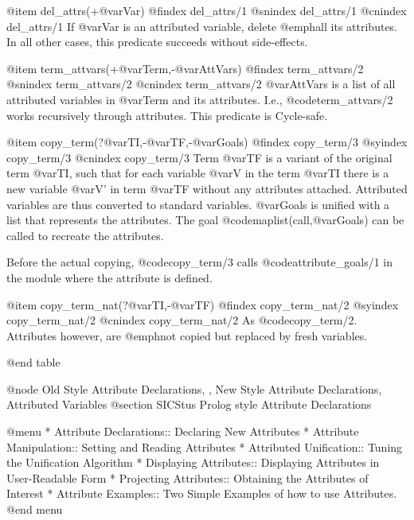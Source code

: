 @item del_attrs(+@var{Var})
@findex del_attrs/1
@snindex del_attrs/1
@cnindex del_attrs/1
If @var{Var} is an attributed variable, delete @emph{all} its
attributes.  In all other cases, this predicate succeeds without
side-effects.

@item term_attvars(+@var{Term},-@var{AttVars})
@findex term_attvars/2
@snindex term_attvars/2
@cnindex term_attvars/2
@var{AttVars} is a list of all attributed variables in @var{Term} and
its attributes. I.e., @code{term_attvars/2} works recursively through
attributes.  This predicate is Cycle-safe.

@item copy_term(?@var{TI},-@var{TF},-@var{Goals}) 
@findex copy_term/3
@syindex copy_term/3
@cnindex copy_term/3
Term @var{TF} is a variant of the original term @var{TI}, such that for
each variable @var{V} in the term @var{TI} there is a new variable @var{V'}
in term @var{TF} without any attributes attached.  Attributed
variables are thus converted to standard variables.  @var{Goals} is
unified with a list that represents the attributes.  The goal
@code{maplist(call,@var{Goals})} can be called to recreate the
attributes.

Before the actual copying, @code{copy_term/3} calls
@code{attribute_goals/1} in the module where the attribute is
defined.

@item copy_term_nat(?@var{TI},-@var{TF}) 
@findex copy_term_nat/2
@syindex copy_term_nat/2
@cnindex copy_term_nat/2
As @code{copy_term/2}.  Attributes however, are @emph{not} copied but replaced
by fresh variables.

@end table

@node Old Style Attribute Declarations, , New Style Attribute Declarations, Attributed Variables
@section SICStus Prolog style Attribute Declarations

@menu
* Attribute Declarations:: Declaring New Attributes
* Attribute Manipulation:: Setting and Reading Attributes
* Attributed Unification:: Tuning the Unification Algorithm
* Displaying Attributes:: Displaying Attributes in User-Readable Form
* Projecting Attributes:: Obtaining the Attributes of Interest
* Attribute Examples:: Two Simple Examples of how to use Attributes.
@end menu

